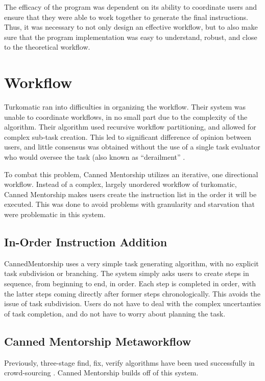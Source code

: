 The efficacy of the program was dependent on its ability to coordinate users and ensure that they were able to work together to generate the final instructions.
Thus, it was necessary to not only design an effective workflow, but to also make sure that the program implementation was easy to understand, robust, and close to the theoretical workflow.

\section{Workflow}
Turkomatic ran into difficulties in organizing the workflow. 
Their system was unable to coordinate workflows, in no small part due to the complexity of the algorithm.
Their algorithm used recursive workflow partitioning, and allowed for complex sub-task creation.
This led to significant difference of opinion between users, and little consensus was obtained without the use of a single task evaluator who would oversee the task (also known as ``derailment'' \cite{kulkarni2012collaboratively}.

To combat this problem, Canned Mentorship utilizes an iterative, one directional workflow.
Instead of a complex, largely unordered workflow of turkomatic, Canned Mentorship makes users create the instruction list in the order it will be executed.
This was done to avoid problems with granularity and starvation that were problematic in this system.

\subsection{In-Order Instruction Addition}
CannedMentorship uses a very simple task generating algorithm, with no explicit task subdivision or branching.
The system simply asks users to create steps in sequence, from beginning to end, in order.
Each step is completed in order, with the latter steps coming directly after former steps chronologically.
This avoids the issue of task subdivision. 
Users do not have to deal with the complex uncertanties of task completion, and do not have to worry about planning the task.

\subsection{Canned Mentorship Metaworkflow}
Previously, three-stage find, fix, verify algorithms have been used successfully in crowd-sourcing \cite{kim2013toolscape,bernstein2010soylent}. Canned Mentorship builds off of this system. 

